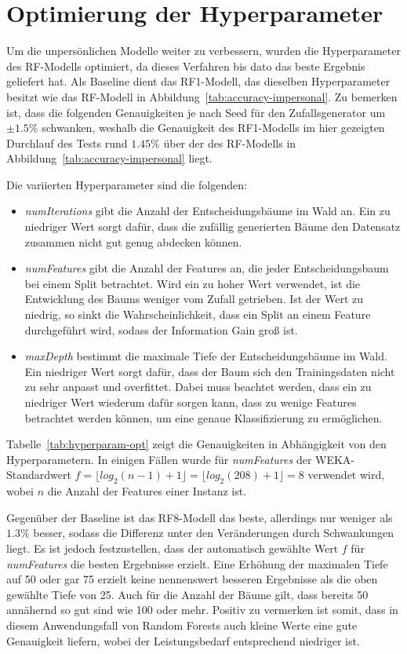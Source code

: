 \section{Optimierung der Hyperparameter}
Um die unpersönlichen Modelle weiter zu verbessern, wurden die Hyperparameter des RF-Modells optimiert, da dieses Verfahren bis dato das beste Ergebnis geliefert hat. Als Baseline dient das RF1-Modell, das dieselben Hyperparameter besitzt wie das RF-Modell in Abbildung~\ref{tab:accuracy-impersonal}. Zu bemerken ist, dass die folgenden Genauigkeiten je nach Seed für den Zufallsgenerator um $\pm 1.5 \%$ schwanken, weshalb die Genauigkeit des RF1-Modells im hier gezeigten Durchlauf des Tests rund $1.45 \%$ über der des RF-Modells in Abbildung~\ref{tab:accuracy-impersonal} liegt.

Die variierten Hyperparameter sind die folgenden:

\begin{itemize}
	\item \textit{numIterations} gibt die Anzahl der Entscheidungsbäume im Wald an. Ein zu niedriger Wert sorgt dafür, dass die zufällig generierten Bäume den Datensatz zusammen nicht gut genug abdecken können.
	\item \textit{numFeatures} gibt die Anzahl der Features an, die jeder Entscheidungsbaum bei einem Split betrachtet. Wird ein zu hoher Wert verwendet, ist die Entwicklung des Baums weniger vom Zufall getrieben. Ist der Wert zu niedrig, so sinkt die Wahrscheinlichkeit, dass ein Split an einem Feature durchgeführt wird, sodass der Information Gain groß ist.
	\item \textit{maxDepth} bestimmt die maximale Tiefe der Entscheidungsbäume im Wald. Ein niedriger Wert sorgt dafür, dass der Baum sich den Trainingsdaten nicht zu sehr anpasst und overfittet. Dabei muss beachtet werden, dass ein zu niedriger Wert wiederum dafür sorgen kann, dass zu wenige Features betrachtet werden können, um eine genaue Klassifizierung zu ermöglichen.
\end{itemize}

Tabelle~\ref{tab:hyperparam-opt} zeigt die Genauigkeiten in Abhängigkeit von den Hyperparametern. In einigen Fällen wurde für \textit{numFeatures} der WEKA-Standardwert $f = \lfloor log_2(n - 1) + 1 \rfloor = \lfloor log_2(208) + 1 \rfloor = 8$ verwendet wird, wobei $n$ die Anzahl der Features einer Instanz ist.

Gegenüber der Baseline ist das RF8-Modell das beste, allerdings nur weniger als $1.3 \%$ besser, sodass die Differenz unter den Veränderungen durch Schwankungen liegt. Es ist jedoch festzustellen, dass der automatisch gewählte Wert $f$ für \textit{numFeatures} die besten Ergebnisse erzielt. Eine Erhöhung der maximalen Tiefe auf 50 oder gar 75 erzielt keine nennenswert besseren Ergebnisse als die oben gewählte Tiefe von 25. Auch für die Anzahl der Bäume gilt, dass bereits 50 annähernd so gut sind wie 100 oder mehr. Positiv zu vermerken ist somit, dass in diesem Anwendungsfall von Random Forests auch kleine Werte eine gute Genauigkeit liefern, wobei der Leistungsbedarf entsprechend niedriger ist.

